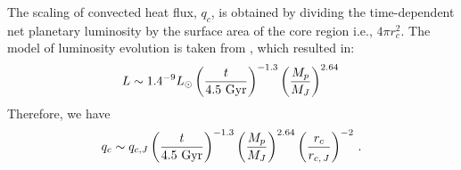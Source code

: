 \documentclass{emulateapj}
\def\memoYF#1{\color{red}$[${\bf #1}$]$ \color{black}}
\begin{document}
The scaling of convected heat flux, $q_c$, is obtained by dividing the time-dependent net planetary luminosity by the surface area of the core region i.e., $4\pi r_c^2$. 
The model of luminosity evolution is taken from \citet{burrows_et_al2001} \citep[see also][]{marley2007}, which resulted in:
\begin{equation}
L \sim 1.4^{-9} L_\odot \left( \frac{t}{4.5 \rm~Gyr} \right)^{-1.3} \left( \frac{M_p}{M_J} \right)^{2.64} \, 	
\label{eq:burrowsLum}
\end{equation}
Therefore, we have
\begin{equation}
q_c \sim q_{c, J} \left( \frac{t}{4.5 \rm~Gyr} \right)^{-1.3} \left( \frac{M_p}{M_J} \right)^{2.64} \left( \frac{r_c}{r_{c,\,J}} \right)^{-2}\, .
\label{eq:burrowsHeatFlux}
\end{equation}

%



\end{document}
